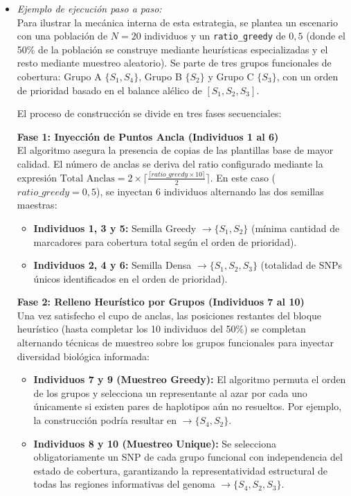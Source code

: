 \documentclass[a4paper,10pt]{article}
\begin{document}
\begin{itemize}
    \item \textit{Ejemplo de ejecución paso a paso:} \\
    Para ilustrar la mecánica interna de esta estrategia, se plantea un escenario con una población de $N=20$ individuos y un \texttt{ratio\_greedy} de $0,5$ (donde el 50\% de la población se construye mediante heurísticas especializadas y el resto mediante muestreo aleatorio). Se parte de tres grupos funcionales de cobertura: Grupo A $\{S_1, S_4\}$, Grupo B $\{S_2\}$ y Grupo C $\{S_3\}$, con un orden de prioridad basado en el balance alélico de $[S_1, S_2, S_3]$.
    
    El proceso de construcción se divide en tres fases secuenciales:

    \textbf{Fase 1: Inyección de Puntos Ancla (Individuos 1 al 6)} \\
    El algoritmo asegura la presencia de copias de las plantillas base de mayor calidad. El número de anclas se deriva del ratio configurado mediante la expresión $\text{Total Anclas} = 2 \times \lceil \frac{\lceil ratio\_greedy \times 10 \rceil}{2} \rceil$. En este caso ($ratio\_greedy=0,5$), se inyectan 6 individuos alternando las dos semillas maestras:
    \begin{itemize}
        \item \textbf{Individuos 1, 3 y 5:} Semilla Greedy $\rightarrow \{S_1, S_2\}$ (mínima cantidad de marcadores para cobertura total según el orden de prioridad).
        \item \textbf{Individuos 2, 4 y 6:} Semilla Densa $\rightarrow \{S_1, S_2, S_3\}$ (totalidad de SNPs únicos identificados en el orden de prioridad).
    \end{itemize}

    \textbf{Fase 2: Relleno Heurístico por Grupos (Individuos 7 al 10)} \\
    Una vez satisfecho el cupo de anclas, las posiciones restantes del bloque heurístico (hasta completar los 10 individuos del 50\%) se completan alternando técnicas de muestreo sobre los grupos funcionales para inyectar diversidad biológica informada:
    \begin{itemize}
        \item \textbf{Individuos 7 y 9 (Muestreo Greedy):} El algoritmo permuta el orden de los grupos y selecciona un representante al azar por cada uno únicamente si existen pares de haplotipos aún no resueltos. Por ejemplo, la construcción podría resultar en $\rightarrow \{S_4, S_2\}$.
        \item \textbf{Individuos 8 y 10 (Muestreo Unique):} Se selecciona obligatoriamente un SNP de cada grupo funcional con independencia del estado de cobertura, garantizando la representatividad estructural de todas las regiones informativas del genoma $\rightarrow \{S_4, S_2, S_3\}$.
    \end{itemize}


\end{itemize}
\end{document}
